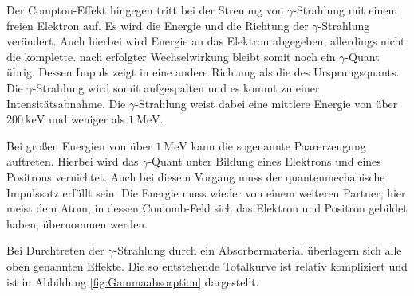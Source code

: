 Der Compton-Effekt hingegen tritt bei der Streuung von $\gamma$-Strahlung mit einem freien Elektron auf.
Es wird die Energie und die Richtung der $\gamma$-Strahlung verändert.
Auch hierbei wird Energie an das Elektron abgegeben, allerdings nicht die komplette.
nach erfolgter Wechselwirkung bleibt somit noch ein $\gamma$-Quant übrig.
Dessen Impuls zeigt in eine andere Richtung als die des Ursprungsquants.
Die $\gamma$-Strahlung wird somit aufgespalten und es kommt zu einer Intensitätsabnahme.
Die $\gamma$-Strahlung weist dabei eine mittlere Energie von über $\SI{200}{\kilo\electronvolt}$ und weniger als $\SI{1}{\mega\electronvolt}$.


Bei großen Energien von über $\SI{1}{\mega\electronvolt}$ kann die sogenannte Paarerzeugung auftreten.
Hierbei wird das $\gamma$-Quant unter Bildung eines Elektrons und eines Positrons vernichtet.
Auch bei diesem Vorgang muss der quantenmechanische Impulssatz erfüllt sein.
Die Energie muss wieder von einem weiteren Partner, hier meist dem Atom, in dessen Coulomb-Feld sich das Elektron und Positron gebildet haben, übernommen werden.


Bei Durchtreten der $\gamma$-Strahlung durch ein Absorbermaterial überlagern sich alle oben genannten Effekte.
Die so entstehende Totalkurve ist relativ kompliziert und ist in Abbildung \ref{fig:Gammaabsorption} dargestellt.
